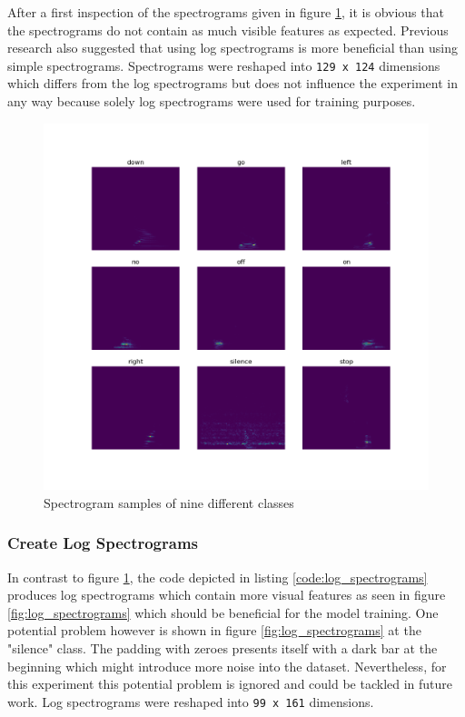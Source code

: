 \documentclass{article}
\theoremstyle{definition}
\theoremstyle{remark}
\begin{document}
After a first inspection of the spectrograms given in figure \ref{fig:spectrograms}, it is obvious that the spectrograms do not contain as much visible features as expected. Previous research \cite{gouda2018speech} also suggested that using log spectrograms is more beneficial than using simple spectrograms. Spectrograms were reshaped into \texttt{129 x 124} dimensions which differs from the log spectrograms but does not influence the experiment in any way because solely log spectrograms were used for training purposes.


\begin{figure}[h!]
    \centering
    \includegraphics[width=1\textwidth]{img/9_spectrograms.png}
    \caption{Spectrogram samples of nine different classes}
    \label{fig:spectrograms}
\end{figure}



\subsubsection{Create Log Spectrograms}

In contrast to figure \ref{fig:spectrograms}, the code depicted in listing \ref{code:log_spectrograms} produces log spectrograms which contain more visual features as seen in figure \ref{fig:log_spectrograms} which should be beneficial for the model training. One potential problem however is shown in figure \ref{fig:log_spectrograms} at the "silence" class. The padding with zeroes presents itself with a dark bar at the beginning which might introduce more noise into the dataset. Nevertheless, for this experiment this potential problem is ignored and could be tackled in future work. Log spectrograms were reshaped into \texttt{99 x 161} dimensions.
\end{document}
